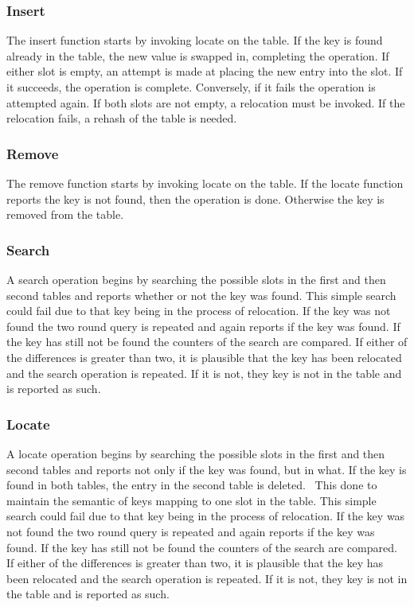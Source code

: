 \documentclass{article}
\begin{document}
\subsubsection{Insert}
The insert function starts by invoking locate on the table. If the key is found already in the table, the new value is
swapped in, completing the operation. If either slot is empty, an attempt is made at placing the new entry into the
slot. If it succeeds, the operation is complete. Conversely, if it fails the operation is attempted again. If both
slots are not empty, a relocation must be invoked. If the relocation fails, a rehash of the table is needed.

\subsubsection{Remove}
The remove function starts by invoking locate on the table. If the locate function reports the key is not found, then
the operation is done. Otherwise the key is removed from the table.

\subsubsection{Search}
A search operation begins by searching the possible slots in the first and then second tables and reports whether or not
the key was found. This simple search could fail due to that key being in the process of relocation. If the key was not
found the two round query is repeated and again reports if the key was found. If the key has still not be found the
counters of the search are compared. If either of the differences is greater than two, it is plausible that the key has
been relocated and the search operation is repeated. If it is not, they key is not in the table and is reported as
such.

\subsubsection{Locate}
A locate operation begins by searching the possible slots in the first and then second tables and reports not only if
the key was found, but in what. If the key is found in both tables, the entry in the second table is deleted. \ This
done to maintain the semantic of keys mapping to one slot in the table. This simple search could fail due to that key
being in the process of relocation. If the key was not found the two round query is repeated and again reports if the
key was found. If the key has still not be found the counters of the search are compared. If either of the differences
is greater than two, it is plausible that the key has been relocated and the search operation is repeated. If it is
not, they key is not in the table and is reported as such.
\end{document}
